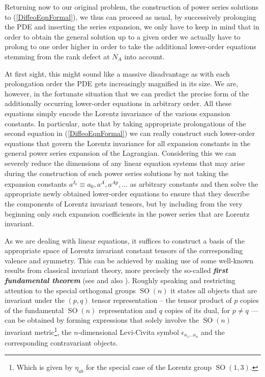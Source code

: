 Returning now to our original problem, the construction of power series solutions to (\ref{DiffeoEqnFormal}), we thus can proceed as usual, by successively prolonging the PDE and inserting the series expansion, we only have to keep in mind that in order to obtain the general solution up to a given order we actually have to prolong to one order higher in order to take the additional lower-order equations stemming from the rank defect at $N_A$ into account. 

At first sight, this might sound like a massive disadvantage as with each prolongation order the PDE gets increasingly magnified in its size. We are, however, in the fortunate situation that we can predict the precise form of the additionally occurring lower-order equations in arbitrary order. All these equations simply encode the Lorentz invariance of the various expansion constants. In particular, note that by taking appropriate prolongations of the second equation in (\ref{DiffeoEqnFormal}) we can really construct such lower-order equations that govern the Lorentz invariance for all expansion constants in the general power series expansion of the Lagrangian. 
Considering this we can severely reduce the dimensions of any linear equation systems that may arise during the construction of such power series solutions by not taking the expansion constants $a^{\tilde{I}_k} \equiv a_0, a^A, a^{Ap},...$ as arbitrary constants and then solve the appropriate newly obtained lower-order equations to ensure that they describe the components of Lorentz invariant tensors, but by including from the very beginning only such expansion coefficients in the power series that are Lorentz invariant.

As we are dealing with linear equations, it suffices to construct a basis of the appropriate space of Lorentz invariant constant tensors of the corresponding valence and symmetry. This can be achieved by making use of some well-known results from classical invariant theory, more precisely the so-called \textit{\textbf{first fundamental theorem}} (see \cite{Aslaksen1995InvariantTO} and also \cite{PROCESI1976306}). Roughly speaking and restricting attention to the special orthogonal groups $\operatorname{SO}(n)$ it states all objects that are invariant under the $(p,q)$ tensor representation -- the tensor product of $p$ copies of the fundamental $\operatorname{SO}(n)$ representation and $q$ copies of its dual, for $p \neq q$ --- can be obtained by forming expressions that solely involve the $\operatorname{SO}(n)$ invariant metric\footnote{Which is given by $\eta_{ab}$ for the special case of the Lorentz group $\operatorname{SO}(1,3)$.}, the $n$-dimensional Levi-Civita symbol $\epsilon_{a_1...a_n}$ and the corresponding contravariant objects. 

